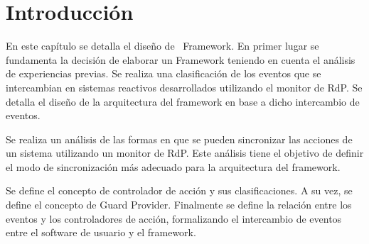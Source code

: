 \section{Introducción}
En este capítulo se detalla el diseño de \nombreFramework \ Framework.
En primer lugar se fundamenta la decisión de elaborar un Framework teniendo en
cuenta el análisis de experiencias previas. Se realiza una clasificación de los
eventos que se intercambian en sistemas reactivos desarrollados utilizando el
monitor de RdP.
Se detalla el diseño de la arquitectura del framework en base a dicho
intercambio de eventos.

Se realiza un análisis de las formas en que se pueden sincronizar las
acciones de un sistema utilizando un monitor de RdP. Este análisis tiene el
objetivo de definir el modo de sincronización más adecuado para la arquitectura
del framework.

Se define el concepto de controlador de acción y sus clasificaciones. A su vez,
se define el concepto de Guard Provider. Finalmente se define la relación entre
los eventos y los controladores de acción, formalizando el intercambio de
eventos entre el software de usuario y el framework.


